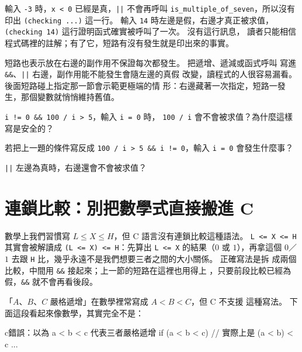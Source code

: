 
輸入 \texttt{-3} 時，\texttt{x < 0} 已經是真，\texttt{||} 不會再呼叫
\texttt{is\_multiple\_of\_seven}，所以沒有印出 \texttt{(checking ...)}
這一行。 輸入 \texttt{14} 時左邊是假，右邊才真正被求值，
\texttt{(checking 14)} 這行證明函式確實被呼叫了一次。 沒有這行訊息，
讀者只能相信程式碼裡的註解；有了它，短路有沒有發生就是印出來的事實。

短路也表示放在右邊的副作用不保證每次都發生。 把遞增、遞減或函式呼叫
寫進 \texttt{\&\&}、\texttt{||} 右邊，副作用能不能發生會隨左邊的真假
改變，讀程式的人很容易漏看。 後面短路碰上指定那一節會示範更極端的情
形：右邊藏著一次指定，短路一發生，那個變數就悄悄維持舊值。


\begin{drills}[label=drills:cond-short-circuit]
\item \texttt{i != 0 \&\& 100 / i > 5}，輸入 \texttt{i = 0} 時，
\texttt{100 / i} 會不會被求值？為什麼這樣寫是安全的？
\item 若把上一題的條件寫反成 \texttt{100 / i > 5 \&\& i != 0}，輸入
\texttt{i = 0} 會發生什麼事？
\item \texttt{||} 左邊為真時，右邊還會不會被求值？
\end{drills}

\section{連鎖比較：別把數學式直接搬進 C}
\label{sec:cond-chained-compare}

數學上我們習慣寫 $L \le X \le H$，但 C 語言沒有連鎖比較這種語法。
\texttt{L <= X <= H} 其實會被解讀成 \texttt{(L <= X) <= H}：先算出
\texttt{L <= X} 的結果（$0$ 或 $1$），再拿這個 $0$／$1$ 去跟
\texttt{H} 比，幾乎永遠不是我們想要三者之間的大小關係。 正確寫法是拆
成兩個比較，中間用 \texttt{\&\&} 接起來；上一節的短路在這裡也用得上
，只要前段比較已經為假，\texttt{\&\&} 就不會再看後段。

「$A$、$B$、$C$ 嚴格遞增」在數學裡常寫成 $A < B < C$，但 C 不支援
這種寫法。 下面這段看起來像數學，其實完全不是：

\begin{code}{c}{錯誤：以為 a < b < c 代表三者嚴格遞增}
if (a < b < c) {   // 實際上是 (a < b) < c
    ...
}
\end{code}

